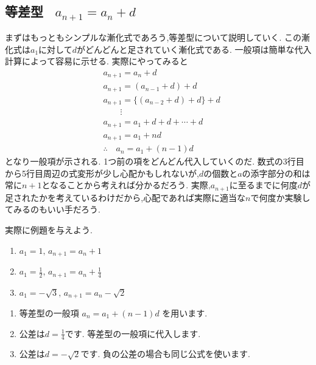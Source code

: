 
  \subsection{\texorpdfstring{等差型 \, $a_{n+1}=a_n+d$}{等差型}}\label{節：等差型}
    まずはもっともシンプルな漸化式であろう,等差型について説明していく.
    この漸化式は$a_1$に対して$d$がどんどんと足されていく漸化式である.
    一般項は簡単な代入計算によって容易に示せる.
    実際にやってみると
    \begin{align*}
      &a_{n+1}=a_n+d\\
      &a_{n+1}=(a_{n-1}+d)+d\\
      &a_{n+1}=\{(a_{n-2}+d)+d\}+d\\
      &\qquad \vdots\\
      &a_{n+1}=a_1+d+d+\cdots+d\\
      &a_{n+1}=a_1+nd\\
      &\therefore \quad a_n=a_1+(n-1)d
    \end{align*}
    となり一般項が示される.
    1つ前の項をどんどん代入していくのだ.
    数式の3行目から5行目周辺の式変形が少し心配かもしれないが,$d$の個数と$a$の添字部分の和は常に$n+1$となることから考えれば分かるだろう.
    実際,$a_{n+1}$に至るまでに何度$d$が足されたかを考えているわけだから,心配であれば実際に適当な$n$で何度か実験してみるのもいい手だろう.

    実際に例題を与えよう.

    \noindent {}
    \begin{enumerate}[label=(\arabic*),parsep=3pt,format=\bookitemlink{example-arithmetic-1}{problem}{answer}]
      \item $\displaystyle a_1=1,\, a_{n+1}=a_n+1$
      \item $\displaystyle a_1=\frac{1}{2},\, a_{n+1}=a_n+\frac{1}{4}$
      \item $\displaystyle a_1=-\sqrt{3},\, a_{n+1}=a_n-\sqrt{2}$
    \end{enumerate}

    \noindent{}
    \begin{enumerate}[label=(\arabic*),parsep=3pt,format=\bookitemlink{example-arithmetic-1}{hint}{problem}]
      \item 等差型の一般項
            $\displaystyle a_n=a_1+(n-1)d$
            を用います.
      \item 公差は$\displaystyle d=\frac14$です.
            等差型の一般項に代入します.
      \item 公差は$\displaystyle d=-\sqrt2$です.
            負の公差の場合も同じ公式を使います.
    \end{enumerate}

